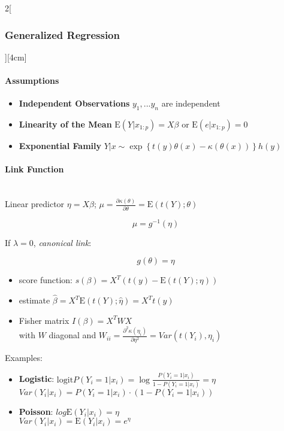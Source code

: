 \documentclass[8pt]{extarticle}
\begin{document}
\begin{multicols}{2}[\subsubsection{Generalized Regression}][4cm]

\paragraph{Assumptions}
\begin{itemize}
\item \textbf{Independent Observations} $y_1,...y_n$ are independent
\item \textbf{Linearity of the Mean} $\mathrm{E}(Y|x_{1:p})= X\beta$ or $\mathrm{E}(e|x_{1:p})= 0$ 
\item \textbf{Exponential Family} $ Y|x \sim \exp\left\{t(y)\theta(x) - \kappa(\theta(x))\right\}h(y)$
\end{itemize}

\paragraph{Link Function} \ \\

\noindent Linear predictor $\eta = X\beta$; $\mu = \frac{\partial \kappa(\theta)}{\partial \theta}= \mathrm{E}(t(Y);\theta)$

$$\mu = g^{-1}(\eta)$$

If $\lambda = 0$, \textit{canonical link}:

$$g(\theta) = \eta$$

\begin{itemize}
\item score function: $s(\beta) = X^T\left(t(y) - \mathrm{E}(t(Y);\eta)\right)$
\item estimate $\hat{\beta} =X^T\mathrm{E}(t(Y);\hat{\eta}) = X^Tt(y)$
\item Fisher matrix $I(\beta) = X^TWX$ \\with $W$ diagonal and $W_{ii} = \frac{\partial^2 \kappa(\eta_i)}{\partial \eta^2} = Var(t(Y_i), \eta_i)$
\end{itemize}

\noindent Examples:
\begin{itemize}
\item \textbf{Logistic}: $\text{logit} P(Y_i{=}1|x_i) = \log\frac{P(Y_i{=}1|x_i)}{1{-}P(Y_i{=}1|x_i)} = \eta$ \\
$Var(Y_i|x_i) = P(Y_i{=}1|x_i)\cdot(1{-}P(Y_i{=}1|x_i))$

\item \textbf{Poisson}: $log \mathrm{E}(Y_i|x_i) = \eta$ \\
$Var(Y_i|x_i) = \mathrm{E}(Y_i|x_i) = e^{\eta}$
\end{itemize}


\end{multicols}
\end{document}
